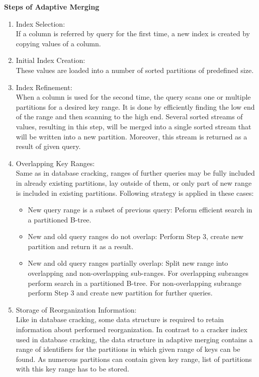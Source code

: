 \documentclass[10pt, conference, compsocconf]{IEEEtran}
\begin{document}
\textbf{Steps of Adaptive Merging} 
\begin{enumerate}
\item{Index Selection:}\\
If a column is referred by query for the first time, a new index is created by copying values of a column. \\
\item{Initial Index Creation:}\\
These values are loaded into a number of sorted partitions of predefined size. \\
\item{Index Refinement:}\\
When a column is used for the second time, the query scans one or multiple partitions for a desired key range. It is done by efficiently finding the low end of the range and then scanning to the high end. Several sorted streams of values, resulting in this step, will be merged into a single sorted stream that will be written into a new partition. Moreover, this stream is returned as a result of given query.\\
\item{Overlapping Key Ranges:}\\
Same as in database cracking, ranges of further queries may be fully included in already existing partitions, lay outside of them, or only part of new range is included in existing partitions. Following strategy is applied in these cases:
\begin{itemize}
\item{New query range is a subset of previous query: }
Peform efficient search in a partitioned B-tree.\\
\item{New and old query ranges do not overlap: }
Perform Step 3, create new partition and return it as a result.\\
\item{New and old query ranges partially overlap: }
Split new range into overlapping and non-overlapping sub-ranges. For overlapping subranges perform search in a partitioned B-tree. For non-overlapping subrange perform Step 3 and create new partition for further queries.\\
\end{itemize}
\item{Storage of Reorganization Information:}\\
Like in database cracking, some data structure is required to retain information about performed reorganization. In contrast to a cracker index used in database cracking, the data structure in adaptive merging contains a range of identifiers for the partitions in which given range of keys can be found. As numerous partitions can contain given key range, list of partitions with this key range has to be stored.
\end{enumerate}
\end{document}
